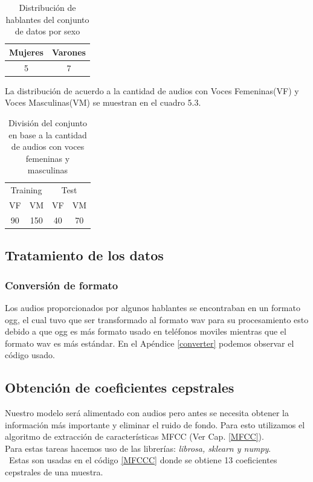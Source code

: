 \begin{table}[H]
	\centering
	\begin{tabular}{|c|c|}
		\hline
		\rowcolor{Gray}Mujeres & Varones \\ \hline
		5      & 7   \\ \hline
	\end{tabular}
	\caption{Distribución de hablantes del conjunto de datos por sexo}
\end{table}


La distribución de acuerdo a la cantidad de audios con Voces Femeninas(VF) y Voces Masculinas(VM) se muestran en el cuadro 5.3.

\begin{table}[H]
	\centering
	\begin{tabular}{|c|c|c|c|}
		\hline
		\rowcolor{Gray} 	\multicolumn{4}{|c|}{conjunto de datos}                    \\ \hline
		\multicolumn{2}{|c|}{Training} & \multicolumn{2}{c|}{Test} \\ \hline
		VF              & VM             & VF          & VM           \\ \hline
		90             & 150           & 40          & 70         \\ \hline
	\end{tabular}
	\caption{División del conjunto en base a la cantidad de audios con voces femeninas y masculinas}
\end{table}

\subsection{Tratamiento de los datos}

\subsubsection{Conversión de formato}
Los audios proporcionados por algunos hablantes se encontraban en un formato ogg, el cual tuvo que ser transformado al formato wav para su procesamiento esto debido a que ogg es más formato usado en teléfonos moviles mientras que el formato wav es más estándar. En el Apéndice \ref{converter} podemos observar el código usado.

\subsection{Obtención de coeficientes cepstrales}
Nuestro modelo será alimentado con audios pero antes se necesita obtener la información más importante y eliminar el ruido de fondo. Para esto utilizamos el algoritmo de extracción de características MFCC  (Ver Cap. \ref{MFCC}).\\  Para estas tareas hacemos uso de las librerías: \textit{librosa, sklearn y numpy}.\\\ Estas son usadas en el código \ref{MFCCC} donde se obtiene 13 coeficientes cepstrales de una muestra.


